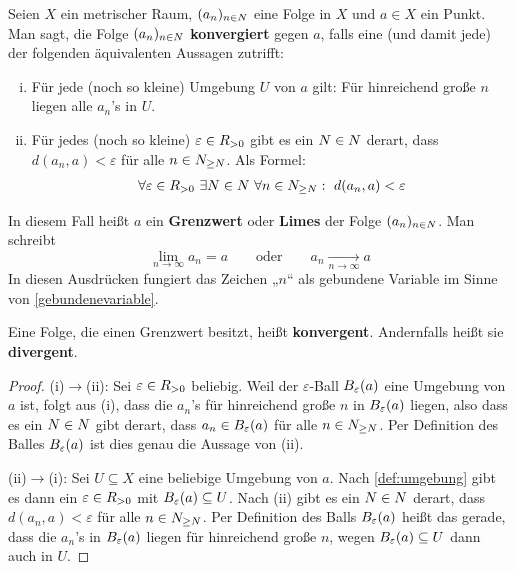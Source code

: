 \begin{defin}[Folgenkonvergenz] \label{def:konvergenz}    
    Seien $X$ ein metrischer Raum, $(a_n)_{n\in \relax N}$ eine Folge in $X$ und $a\in X$ ein Punkt. Man sagt, die Folge $(a_n)_{n\in \relax N}$ \textbf{konvergiert} gegen $a$, falls eine (und damit jede) der folgenden äquivalenten Aussagen zutrifft:
    \begin{enumerate}[(i)]
        \item Für jede (noch so kleine) Umgebung $U$ von $a$ gilt: Für hinreichend große $n$ liegen alle $a_n$'s in $U$.
        \item Für jedes (noch so kleine) $\varepsilon \in \relax R_{>0}$ gibt es ein $N\in \relax N$ derart, dass $d(a_n,a)<\varepsilon$ für alle $n\in \relax N_{\ge N}$. Als Formel:
        \begin{align*}
            \forall\varepsilon\in \relax R_{>0}\ \exists N\in\relax N\ \forall n\in \relax N_{\ge N}:\ d(a_n,a)<\varepsilon
        \end{align*}
    \end{enumerate}
    In diesem Fall heißt $a$ ein \textbf{Grenzwert} oder \textbf{Limes} der Folge $(a_n)_{n\in \relax N}$. Man schreibt
        \[ \lim_{n\to\infty}a_n=a \qquad\text{oder}\qquad a_n\xrightarrow[n\to \infty]{} a \]
    In diesen Ausdrücken fungiert das Zeichen „$n$“ als gebundene Variable im Sinne von \cref{gebundenevariable}.

    Eine Folge, die einen Grenzwert besitzt, heißt \textbf{konvergent}. Andernfalls heißt sie \textbf{divergent}.
\end{defin}
\begin{proof}
    (i)$\to$(ii): Sei $\varepsilon\in \relax R_{> 0}$ beliebig. Weil der $\varepsilon$-Ball $\relax B_\varepsilon(a)$ eine Umgebung von $a$ ist, folgt aus (i), dass die $a_n$'s für hinreichend große $n$ in $\relax B_\varepsilon(a)$ liegen, also dass es ein $N\in \relax N$ gibt derart, dass $a_n\in \relax B_\varepsilon(a)$ für alle $n\in \relax N_{\ge N}$. Per Definition des Balles $\relax B_\varepsilon(a)$ ist dies genau die Aussage von (ii).

    (ii)$\to$(i): Sei $U\subseteq X$ eine beliebige Umgebung von $a$. Nach \cref{def:umgebung} gibt es dann ein $\varepsilon\in \relax R_{>0}$ mit $\relax B_\varepsilon(a)\subseteq U$. Nach (ii) gibt es ein $N\in \relax N$ derart, dass $d(a_n,a)<\varepsilon$ für alle $n\in \relax N_{\ge N}$. Per Definition des Balls $\relax B_\varepsilon(a)$ heißt das gerade, dass die $a_n$'s in $\relax B_\varepsilon(a)$ liegen für hinreichend große $n$, wegen $\relax B_\varepsilon(a)\subseteq U$ dann auch in $U$.
\end{proof}


